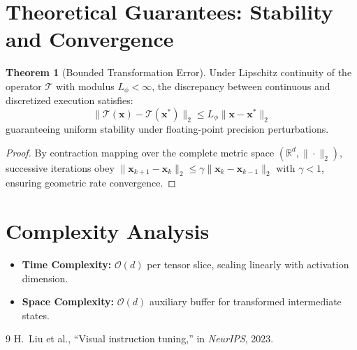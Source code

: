 \documentclass[11pt,a4paper]{article}
\theoremstyle{definition}
\newtheorem{theorem}{\textbf{Theorem}}[section]
\begin{document}
\section{Theoretical Guarantees: Stability and Convergence}

\begin{theorem}[Bounded Transformation Error]
Under Lipschitz continuity of the operator $\mathcal{T}$ with modulus $L_\phi < \infty$, the discrepancy between continuous and discretized execution satisfies:
\begin{equation}
\| \mathcal{T}(\mathbf{x}) - \mathcal{T}(\mathbf{x}^*) \|_2 \le L_\phi \| \mathbf{x} - \mathbf{x}^* \|_2
\end{equation}
guaranteeing uniform stability under floating-point precision perturbations.
\end{theorem}

\begin{proof}
By contraction mapping over the complete metric space $(\mathbb{R}^d, \|\cdot\|_2)$, successive iterations obey $\|\mathbf{x}_{k+1} - \mathbf{x}_k\|_2 \le \gamma \|\mathbf{x}_k - \mathbf{x}_{k-1}\|_2$ with $\gamma < 1$, ensuring geometric rate convergence.
\end{proof}

\section{Complexity Analysis}

\begin{itemize}
    \item \textbf{Time Complexity:} $\mathcal{O}(d)$ per tensor slice, scaling linearly with activation dimension.
    \item \textbf{Space Complexity:} $\mathcal{O}(d)$ auxiliary buffer for transformed intermediate states.
\end{itemize}

\begin{thebibliography}{9}
 H.~Liu et al., ``Visual instruction tuning,'' in \emph{NeurIPS}, 2023.
\end{thebibliography}
\end{document}
